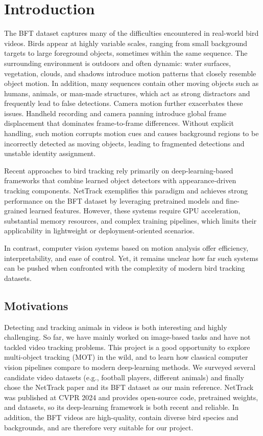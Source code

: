 \section{Introduction}
\label{sec:intro}

The BFT dataset captures many of the difficulties encountered in real-world bird videos. Birds appear at highly variable scales, ranging from small background targets to large foreground objects, sometimes within the same sequence. The surrounding environment is outdoors and often dynamic: water surfaces, vegetation, clouds, and shadows introduce motion patterns that closely resemble object motion. In addition, many sequences contain other moving objects such as humans, animals, or man-made structures, which act as strong distractors and frequently lead to false detections. Camera motion further exacerbates these issues. Handheld recording and camera panning introduce global frame displacement that dominates frame-to-frame differences. Without explicit handling, such motion corrupts motion cues and causes background regions to be incorrectly detected as moving objects, leading to fragmented detections and unstable identity assignment.

Recent approaches to bird tracking rely primarily on deep-learning-based frameworks that combine learned object detectors with appearance-driven tracking components. NetTrack exemplifies this paradigm and achieves strong performance on the BFT dataset by leveraging pretrained models and fine-grained learned features. However, these systems require GPU acceleration, substantial memory resources, and complex training pipelines, which limits their applicability in lightweight or deployment-oriented scenarios.

In contrast, computer vision systems based on motion analysis offer efficiency, interpretability, and ease of control. Yet, it remains unclear how far such systems can be pushed when confronted with the complexity of modern bird tracking datasets.


\subsection{Motivations}

Detecting and tracking animals in videos is both interesting and highly challenging. So far, we have mainly worked on image-based tasks and have not tackled video tracking problems. This project is a good opportunity to explore multi-object tracking (MOT) in the wild, and to learn how classical computer vision pipelines compare to modern deep-learning methods. We surveyed several candidate video datasets (e.g., football players, different animals) and finally chose the NetTrack paper and its BFT dataset as our main reference. NetTrack was published at CVPR 2024 and provides open-source code, pretrained weights, and datasets, so its deep-learning framework is both recent and reliable. In addition, the BFT videos are high-quality, contain diverse bird species and backgrounds, and are therefore very suitable for our project.

